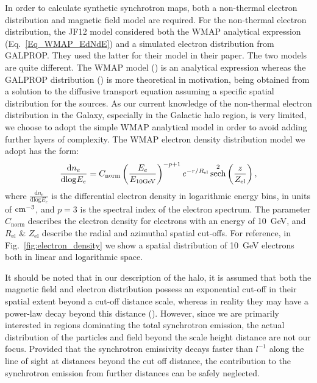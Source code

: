 \documentclass[usenatbib]{mnras}
\DeclareMathOperator{\sech}{sech}
\begin{document}
In order to calculate synthetic synchrotron maps, both a non-thermal electron distribution and magnetic field model are required. For the non-thermal electron distribution, the JF12 model considered both the WMAP analytical expression (Eq.~\ref{Eq_WMAP_EdNdE}) and a simulated electron distribution from GALPROP. They used the latter for their model in their paper. The two models are quite different. The WMAP model (\cite{WMAP_Page}) is an analytical expression whereas the GALPROP distribution (\cite{Hammurabi}) is more theoretical in motivation, being obtained from a solution to the diffusive transport equation assuming a specific spatial distribution for the sources. As our current knowledge of the non-thermal electron distribution in the Galaxy, especially in the Galactic halo region, is very limited, we choose to adopt the simple WMAP analytical model in order to avoid adding further layers of complexity. The WMAP electron density distribution model we adopt has the form:
\begin{equation}\label{Eq_WMAP_EdNdE}
    \frac{\mathrm{d}n_e}{\mathrm{dlog}E_{e}} =     C_\mathrm{norm} \left(\frac{E_e}{E_{\rm 10 GeV}}\right)^{-p+1} e^{-r/R_{\mathrm{el}}} \sech^2\left(\frac{z}{Z_{\mathrm{el}}}\right), 
\end{equation}
where $\frac{\mathrm{d}n_e}{\mathrm{dlog}E_{e}}$ is the differential electron density in logarithmic energy bins, in units of ${\rm cm}^{-3}$, and $p =3$ is the spectral index of the electron spectrum. The parameter $C_\mathrm{norm}$ describes the electron density for electrons with an energy of 10~GeV, and $R_{\mathrm{el}}$ \& $Z_{\mathrm{el}}$ describe the radial and azimuthal spatial cut-offs. For reference, in Fig.~\ref{fig:electron_density} we show a spatial distribution of 10~GeV electrons both in linear and logarithmic space.

It should be noted that in our description of the halo, it is assumed that both the magnetic field and electron distribution possess an exponential cut-off in their spatial extent beyond a cut-off distance scale, whereas in reality they may have a power-law decay beyond this distance
(\cite{Hammurabi, Subramanian_2018, Bell_2022}). However, since we are primarily interested in regions dominating the total synchrotron emission, the actual distribution of the particles and field beyond the scale height distance are not our focus. Provided that the synchrotron emissivity decays faster than $l^{-1}$ along the line of sight at distances beyond the cut off distance, the contribution to the synchrotron emission from further distances can be safely neglected. 
\end{document}
